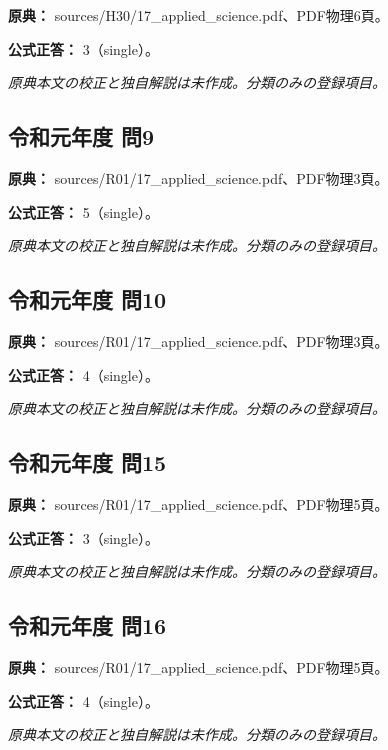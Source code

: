 \noindent\textbf{原典：} sources/H30/17\_applied\_science.pdf、PDF物理6頁。

\textbf{公式正答：} 3（single）。

\par\textit{原典本文の校正と独自解説は未作成。分類のみの登録項目。}

\subsection{令和元年度 問9}
\label{q:r01-reg-applied-09}

\noindent\textbf{原典：} sources/R01/17\_applied\_science.pdf、PDF物理3頁。

\textbf{公式正答：} 5（single）。

\par\textit{原典本文の校正と独自解説は未作成。分類のみの登録項目。}

\subsection{令和元年度 問10}
\label{q:r01-reg-applied-10}

\noindent\textbf{原典：} sources/R01/17\_applied\_science.pdf、PDF物理3頁。

\textbf{公式正答：} 4（single）。

\par\textit{原典本文の校正と独自解説は未作成。分類のみの登録項目。}

\subsection{令和元年度 問15}
\label{q:r01-reg-applied-15}

\noindent\textbf{原典：} sources/R01/17\_applied\_science.pdf、PDF物理5頁。

\textbf{公式正答：} 3（single）。

\par\textit{原典本文の校正と独自解説は未作成。分類のみの登録項目。}

\subsection{令和元年度 問16}
\label{q:r01-reg-applied-16}

\noindent\textbf{原典：} sources/R01/17\_applied\_science.pdf、PDF物理5頁。

\textbf{公式正答：} 4（single）。

\par\textit{原典本文の校正と独自解説は未作成。分類のみの登録項目。}

